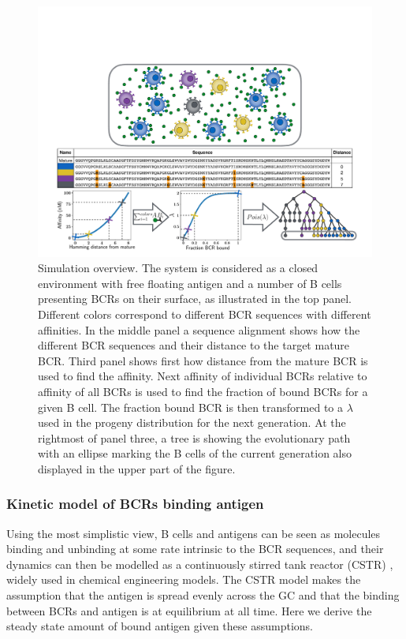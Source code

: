 \begin{figure}[ht!]
    \centering
    \includegraphics[width=1\textwidth]{figures/simulation_figure.pdf}
    \caption{
        \label{fig:simulation_figure}
        Simulation overview.
        The system is considered as a closed environment with free floating antigen and a number of B cells presenting BCRs on their surface, as illustrated in the top panel.
        Different colors correspond to different BCR sequences with different affinities.
        In the middle panel a sequence alignment shows how the different BCR sequences and their distance to the target mature BCR.
        Third panel shows first how distance from the mature BCR is used to find the affinity.
        Next affinity of individual BCRs relative to affinity of all BCRs is used to find the fraction of bound BCRs for a given B cell.
        The fraction bound BCR is then transformed to a $\lambda$ used in the progeny distribution for the next generation.
        At the rightmost of panel three, a tree is showing the evolutionary path with an ellipse marking the B cells of the current generation also displayed in the upper part of the figure.
    }
\end{figure}







\subsubsection{Kinetic model of BCRs binding antigen}
Using the most simplistic view, B cells and antigens can be seen as molecules binding and unbinding at some rate intrinsic to the BCR sequences, and their dynamics can then be modelled as a continuously stirred tank reactor (CSTR) \cite{CSTR}, widely used in chemical engineering models.
The CSTR model makes the assumption that the antigen is spread evenly across the GC and that the binding between BCRs and antigen is at equilibrium at all time.
Here we derive the steady state amount of bound antigen given these assumptions.



